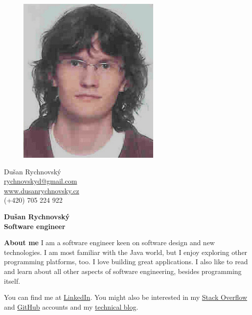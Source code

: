 \documentclass[a4paper,11pt,final]{memoir}
\newcommand{\Sep}{\vspace{1.5em}}
\newenvironment{AboutMe}
	{\ignorespaces\textbf{\color{RoyalBlue} About me}}
	{\Sep\ignorespacesafterend}
\begin{document}
\begin{figure}
	\hfill
	\includegraphics[width=0.6\columnwidth]{photo.jpg}
	\vspace{-7cm}
\end{figure}

\begin{flushright}\small
	Dušan Rychnovský \\
	\url{rychnovskyd@gmail.com}  \\
	\url{www.dusanrychnovsky.cz} \\
	(+420) 705 224 922
\end{flushright}\normalsize
\framebreak


\Huge\bfseries {\color{RoyalBlue} Dušan Rychnovský} \\
\Large\bfseries  Software engineer \\

\normalsize\normalfont

\begin{AboutMe}
I am a software engineer keen on software design and new technologies. I am most familiar with the Java world, but I enjoy exploring other programming platforms, too. I love building great applications. I also like to read and learn about all other aspects of software engineering, besides programming itself.

\medskip
You can find me at 
\href{http://cz.linkedin.com/pub/du%C5%A1an-rychnovsk%C3%BD/96/a42/a0/}{LinkedIn}.
You might also be interested in my
\href{http://stackoverflow.com/users/1103412/dusan-rychnovsky}{Stack Overflow} and
\href{https://github.com/dusan-rychnovsky}{GitHub} accounts and my
\href{http://blog.dusanrychnovsky.cz}{technical blog}.
\end{AboutMe}
\end{document}
